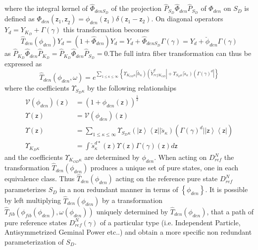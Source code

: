 \documentclass[aps,preprint]{revtex4}%
\begin{document}
where the integral kernel of $\hat{\Phi}_{denS_{D}}$ of the projection
$\hat{P}_{S_{D}}\hat{\Phi}_{den}\hat{P}_{S_{D}}$ of $\hat{\Phi}_{den}$ on
$S_{D}$ is defined as $\Phi_{den}\left(  \mathsf{z}_{1}\mathsf{,z}_{2}\right)
=\phi_{den}\left(  \mathsf{z}_{1}\right)  \delta\left(  \mathsf{z}%
_{1}-\mathsf{z}_{2}\right)  $. On diagonal operators $Y_{d}=Y_{K_{D}}%
+\Gamma\left(  \gamma\right)  $ this transformation becomes
\begin{equation}
\hat{T}_{den}\left(  \phi_{den}\right)  Y_{d}=\left(  1+\hat{\Phi}%
_{den}\right)  Y_{d}=Y_{d}+\hat{\Phi}_{denS_{D}}\Gamma\left(  \gamma\right)
=Y_{d}+\breve{\phi}_{den}\Gamma\left(  \gamma\right)
\end{equation}
as $\hat{P}_{K_{D}}\hat{\Phi}_{den}\hat{P}_{K_{D}}=\hat{P}_{K_{D}}\hat{\Phi
}_{den}\hat{P}_{S_{D}}=0.$The full intra fiber transformation can thus be
expressed as
\begin{equation}
\hat{T}_{den}\left(  \phi_{den},\omega\right)  =e^{\sum_{1\leq\kappa\leq
\infty}\left\{  \Upsilon_{K_{OD}\kappa}\left|  \breve{h}_{\kappa}\right)
\left(  \breve{Y}_{refK_{OD}}^{d}\right|  +\Upsilon_{S_{D}\kappa}\left|
\breve{s}_{\kappa}\right)  \left(  \Gamma\left(  \gamma\right)  ^{d}\right|
\right\}  } \label{refden}%
\end{equation}
where the coefficients $\Upsilon_{S_{D}\kappa}$ by the following relationships%
\begin{align}
\mathcal{V}\left(  \phi_{den}\right)  \left(  \mathsf{z}\right)   &  =\left(
1+\phi_{den}\left(  \mathsf{z}\right)  \right)  ^{\frac{1}{2}}\nonumber\\
\Upsilon\left(  \mathsf{z}\right)   &  =\mathcal{V}\left(  \phi_{den}\right)
\left(  \mathsf{z}\right) \nonumber\\
\Upsilon\left(  \mathsf{z}\right)   &  =\sum_{1\leq\kappa\leq\infty}%
\Upsilon_{S_{D}\kappa}\left(  \left|  \mathsf{z}\right\rangle \left\langle
\mathsf{z}\right|  |\breve{s}_{\kappa}\right)  \left(  \Gamma\left(
\gamma\right)  ^{d}|\left|  \mathsf{z}\right\rangle \left\langle
\mathsf{z}\right|  \right) \nonumber\\
\Upsilon_{K_{D}\kappa}  &  =\int\breve{s}_{\kappa}^{d\ast}\left(
\mathsf{z}\right)  \Upsilon\left(  \mathsf{z}\right)  \Gamma\left(
\gamma\right)  \left(  \mathsf{z}\right)  d\mathsf{z}%
\end{align}
and the coefficients $\Upsilon_{K_{OD}\kappa}$ are determined by $\phi_{den}$.
When acting on $D_{ref}^{N}$ the transformation $\hat{T}_{den}\left(
\phi_{den}\right)  $ produces a unique set of pure states, one in each
equivalence class. Thus $\hat{T}_{den}\left(  \phi_{den}\right)  $ acting on
the reference pure state $D_{ref}^{N}$ parameterizes $S_{D}$ in a non
redundant manner in terms of $\left\{  \phi_{den}\right\}  $. It is possible
by left multiplying $\hat{T}_{den}\left(  \phi_{den}\right)  $ by a
transformation $\hat{T}_{fib}\left(  \phi_{fib}\left(  \phi_{den}\right)
,\omega\left(  \phi_{den}\right)  \right)  $ uniquely determined by $\hat
{T}_{den}\left(  \phi_{den}\right)  $, that a path of pure reference states
$D_{ref}^{N}\left(  \gamma\right)  $ of a particular type (i.e. Independent
Particle, Antisymmetrized Geminal Power etc..) and obtain a more specific non
redundant parameterization of $S_{D}$.
\end{document}
